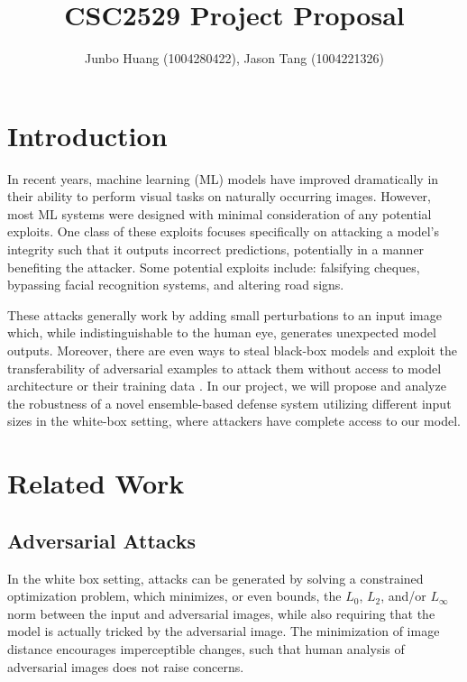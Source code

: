 \documentclass[10pt,journal,compsoc]{IEEEtran}
\title{CSC2529 Project Proposal}
\author{Junbo Huang (1004280422), Jason Tang (1004221326)}
\begin{document}
\maketitle



\section{Introduction}
In recent years, machine learning (ML) models have improved dramatically in their ability to perform visual tasks on naturally occurring images. However, most ML systems were designed with minimal consideration of any potential exploits. One class of these exploits focuses specifically on attacking a model’s integrity such that it outputs incorrect predictions, potentially in a manner benefiting the attacker. Some potential exploits include: falsifying cheques, bypassing facial recognition systems, and altering road signs.

These attacks generally work by adding small perturbations to an input image which, while indistinguishable to the human eye, generates unexpected model outputs. Moreover, there are even ways to steal black-box models and exploit the transferability of adversarial examples to attack them without access to model architecture or their training data \cite{pbba}. In our project, we will propose and analyze the robustness of a novel ensemble-based defense system utilizing different input sizes in the white-box setting, where attackers have complete access to our model.

\section{Related Work}
\subsection{Adversarial Attacks}

In the white box setting, attacks can be generated by solving a constrained optimization problem, which minimizes, or even bounds, the $L_0$, $L_2$, and/or $L_\infty$ norm between the input and adversarial images, while also requiring that the model is actually tricked by the adversarial image. The minimization of image distance encourages imperceptible changes, such that human analysis of adversarial images does not raise concerns. 
\end{document}

